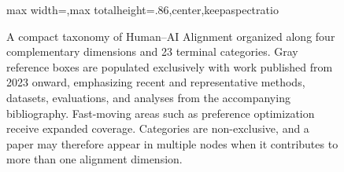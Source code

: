 \begin{figure}[p]
\begin{adjustbox}{max width=\textwidth,max totalheight=.86\textheight,center,keepaspectratio}
\begin{tikzpicture}
\end{tikzpicture}
\end{adjustbox}
\endgroup
\caption{A compact taxonomy of Human--AI Alignment organized along four complementary dimensions and 23 terminal categories. Gray reference boxes are populated exclusively with work published from 2023 onward, emphasizing recent and representative methods, datasets, evaluations, and analyses from the accompanying bibliography. Fast-moving areas such as preference optimization receive expanded coverage. Categories are non-exclusive, and a paper may therefore appear in multiple nodes when it contributes to more than one alignment dimension.}
\label{fig:human-ai-alignment-taxonomy}
\end{figure}